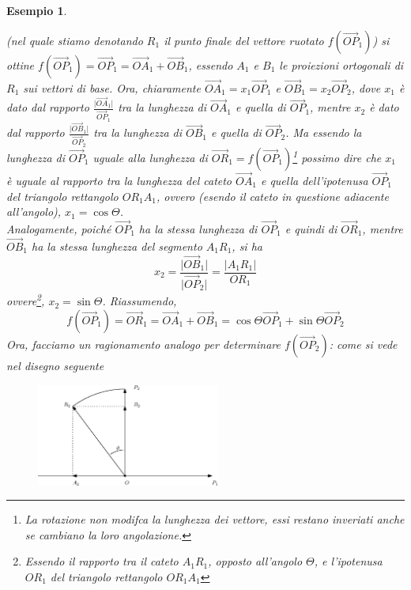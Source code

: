 \documentclass{book}
\newcommand{\abs}[1]{\lvert#1\rvert}
\newtheorem{esempio}{Esempio}
\begin{document}
\begin{esempio}
\begin{enumerate}
    (nel quale stiamo denotando $R_1$ il punto finale del vettore ruotato $f(\vec{OP}_1)$) si ottine
    $f(\vec{OP}_1)=\vec{OP}_1=\vec{OA}_1+\vec{OB}_1$, essendo $A_1$ e $B_1$ le proiezioni ortogonali di $R_1$
    sui vettori di base. Ora, chiaramente $\vec{OA}_1=x_1\vec{OP}_1$ e $\vec{OB}_1=x_2\vec{OP}_2$, dove $x_1$ è
    dato dal rapporto $\frac{\abs{\vec{OA}_1}}{\vec{OP}_1}$ tra la lunghezza di $\vec{OA}_1$ e quella di
    $\vec{OP}_1$, mentre $x_2$ è dato dal rapporto $\frac{\abs{\vec{OB}_1}}{\vec{OP}_2}$ tra la lunghezza di
    $\vec{OB}_1$ e quella di $\vec{OP}_2$. Ma essendo la lunghezza di $\vec{OP}_1$ uguale alla lunghezza di
    $\vec{OR}_1=f(\vec{OP}_1)$\footnote{La rotazione non modifca la lunghezza dei vettore, essi restano
      inveriati anche se cambiano la loro angolazione.} possimo dire che $x_1$ è uguale al rapporto tra la
    lunghezza del cateto $\vec{OA}_1$ e quella dell'ipotenusa $\vec{OP}_1$ del triangolo rettangolo $OR_1A_1$,
    ovvero (esendo il cateto in questione adiacente all'angolo), $x_1=\cos\Theta$. \\
    Analogamente, poiché $\vec{OP}_1$ ha la stessa lunghezza di $\vec{OP}_1$ e quindi di $\vec{OR}_1$, mentre
    $\vec{OB}_1$ ha la stessa lunghezza del segmento $A_1R_1$, si ha 
    \begin{equation*}
      x_2=\frac{\abs{\vec{OB}_1}}{\abs{\vec{OP}_2}}=\frac{\abs{A_1R_1}}{OR_1}
    \end{equation*}
    ovvere\footnote{Essendo il rapporto tra il cateto $A_1R_1$, opposto all'angolo $\Theta$, e l'ipotenusa
      $OR_1$ del triangolo rettangolo $OR_1A_1$}, $x_2=\sin \Theta$. Riassumendo,
    \begin{equation}
      f(\vec{OP}_1)=\vec{OR}_1=\vec{OA}_1+\vec{OB}_1=\cos\Theta \vec{OP}_1+\sin \Theta \vec{OP}_2
    \end{equation}
    Ora, facciamo un ragionamento analogo per determinare $f(\vec{OP}_2)$: come si vede nel disegno seguente
    \begin{figure}[th]
      \centering
        \includegraphics[width=6cm]{img/finiti/imgex4-3-3.eps}
    \end{figure}
      

\end{enumerate}
\end{esempio}
\end{document}
